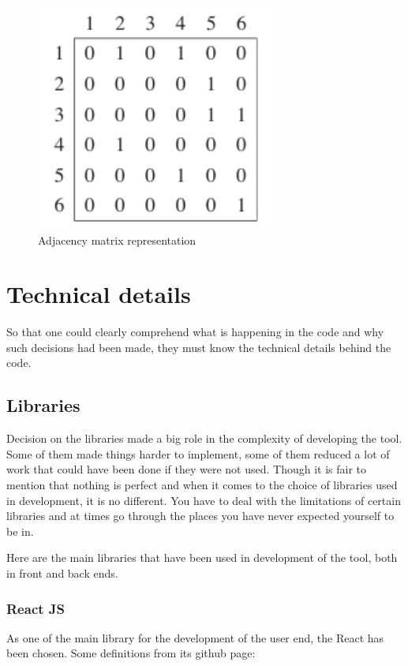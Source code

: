 \begin{figure}[H]
	\centering
	\includegraphics[width=80mm]{images/matrix_representation.png}
	\caption{Adjacency matrix representation}
\end{figure}

\section{Technical details}

So that one could clearly comprehend what is happening in the code and why such decisions had been made, they must know the technical details behind the code.

\subsection{Libraries}

Decision on the libraries made a big role in the complexity of developing the tool. Some of them made things harder to implement, some of them reduced a lot of work that could have been done if they were not used. Though it is fair to mention that nothing is perfect and when it comes to the choice of libraries used in development, it is no different. You have to deal with the limitations of certain libraries and at times go through the places you have never expected yourself to be in. 

Here are the main libraries that have been used in development of the tool, both in front and back ends.

\subsubsection{React JS}

As one of the main library for the development of the user end, the React has been chosen. Some definitions from its github page:

